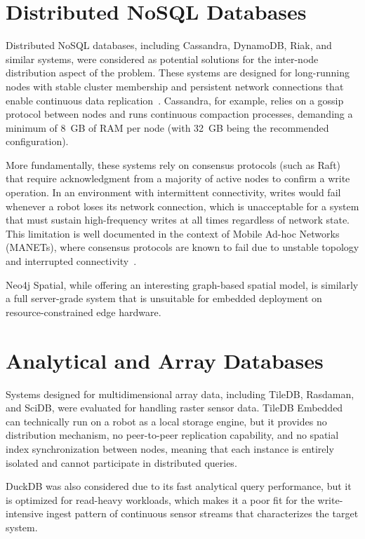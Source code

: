 \section{Distributed NoSQL Databases} \label{sec:nosql-databases}

Distributed NoSQL databases, including Cassandra, DynamoDB, Riak, and similar systems, were considered as potential solutions for the inter-node distribution aspect of the problem. These systems are designed for long-running nodes with stable cluster membership and persistent network connections that enable continuous data replication~\cite{ding2024distributed}. Cassandra, for example, relies on a gossip protocol between nodes and runs continuous compaction processes, demanding a minimum of 8~GB of RAM per node (with 32~GB being the recommended configuration).

More fundamentally, these systems rely on consensus protocols (such as Raft) that require acknowledgment from a majority of active nodes to confirm a write operation. In an environment with intermittent connectivity, writes would fail whenever a robot loses its network connection, which is unacceptable for a system that must sustain high-frequency writes at all times regardless of network state. This limitation is well documented in the context of Mobile Ad-hoc Networks (MANETs), where consensus protocols are known to fail due to unstable topology and interrupted connectivity~\cite{sichitiu2005mesh}.

Neo4j Spatial, while offering an interesting graph-based spatial model, is similarly a full server-grade system that is unsuitable for embedded deployment on resource-constrained edge hardware.


\section{Analytical and Array Databases} \label{sec:analytical-databases}

Systems designed for multidimensional array data, including TileDB, Rasdaman, and SciDB, were evaluated for handling raster sensor data. TileDB Embedded can technically run on a robot as a local storage engine, but it provides no distribution mechanism, no peer-to-peer replication capability, and no spatial index synchronization between nodes, meaning that each instance is entirely isolated and cannot participate in distributed queries.

DuckDB was also considered due to its fast analytical query performance, but it is optimized for read-heavy workloads, which makes it a poor fit for the write-intensive ingest pattern of continuous sensor streams that characterizes the target system.


